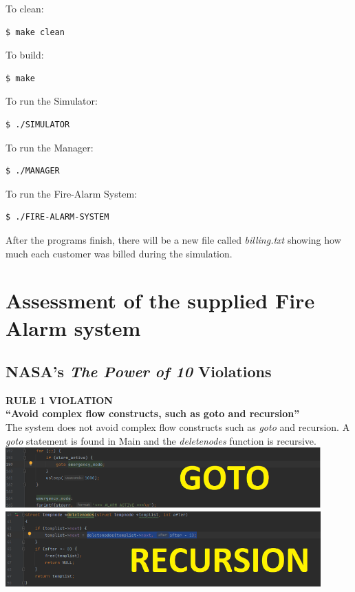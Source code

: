 \documentclass[a4paper]{article}
\begin{document}
\noindent To clean:
\begin{lstlisting}[language=bash]
  $ make clean
\end{lstlisting}

\noindent To build:
\begin{lstlisting}[language=bash]
  $ make
\end{lstlisting}

\noindent To run the Simulator:
\begin{lstlisting}[language=bash]
  $ ./SIMULATOR
\end{lstlisting}

\noindent To run the Manager:
\begin{lstlisting}[language=bash]
  $ ./MANAGER
\end{lstlisting}

\noindent To run the Fire-Alarm System:
\begin{lstlisting}[language=bash]
  $ ./FIRE-ALARM-SYSTEM
\end{lstlisting}


\noindent After the programs finish, there will be a new file called \emph{billing.txt} showing how much each customer was billed during the simulation.

\section{Assessment of the supplied Fire Alarm system}

\subsection{NASA’s \emph{The Power of 10} Violations}

\par \noindent \textbf{RULE 1 VIOLATION\\“Avoid complex flow constructs, such as goto and recursion”} \\[1\baselineskip]
The system does not avoid complex flow constructs such as \emph{goto} and recursion. A \emph{goto} statement is found in Main and the \emph{deletenodes} function is recursive. \\[1\baselineskip]
\includegraphics[width=12.12cm]{report-img/nasa-rule-1-violation.png}
\\
\includegraphics[width=12.12cm]{report-img/nasa-rule-1-violation-2.png}
\end{document}

